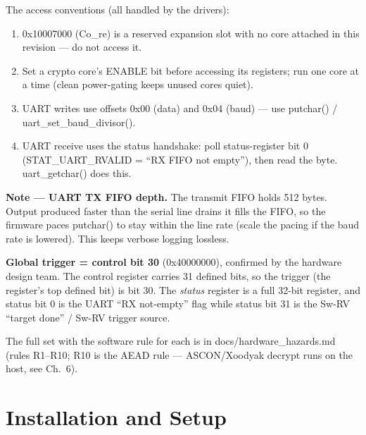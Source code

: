 \documentclass[11pt,a4paper]{report}
\newcommand{\code}[1]{{\ttfamily\small #1}}
\begin{document}
\begin{danger}
The access conventions (all handled by the drivers):
\begin{enumerate}[leftmargin=1.4em,nosep]
\item \code{0x10007000} (\code{Co\_re}) is a reserved expansion slot with no core
attached in this revision --- do not access it.
\item Set a crypto core's \code{ENABLE} bit before accessing its registers; run
one core at a time (clean power-gating keeps unused cores quiet).
\item UART writes use offsets \code{0x00} (data) and \code{0x04} (baud) --- use
\code{putchar()} / \code{uart\_set\_baud\_divisor()}.
\item UART receive uses the status handshake: poll status-register bit 0
(\code{STAT\_UART\_RVALID} = ``RX FIFO not empty''), then read the byte.
\code{uart\_getchar()} does this.
\end{enumerate}
\end{danger}

\begin{notebox}
\textbf{Note --- UART TX FIFO depth.} The transmit FIFO holds 512 bytes.
Output produced faster than the serial line drains it fills the FIFO, so the
firmware paces \code{putchar()} to stay within the line rate (scale the pacing if
the baud rate is lowered). This keeps verbose logging lossless.
\end{notebox}

\begin{factbox}
\textbf{Global trigger = control bit 30} (\code{0x40000000}), confirmed by the
hardware design team. The control register carries 31 defined bits, so the trigger
(the register's top defined bit) is bit 30. The \emph{status} register is a full
32-bit register, and status bit 0 is the UART ``RX not-empty'' flag while status
bit 31 is the Sw-RV ``target done'' / Sw-RV trigger source.
\end{factbox}

The full set with the software rule for each is in \code{docs/hardware\_hazards.md}
(rules R1--R10; R10 is the AEAD rule --- ASCON/Xoodyak decrypt runs on the host,
see Ch.~6).

\chapter{Installation and Setup}
\end{document}
